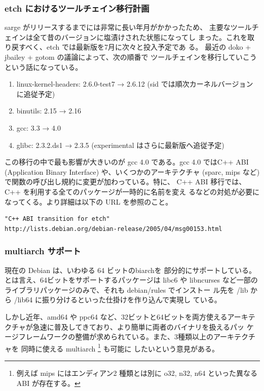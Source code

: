 \documentclass[mingoth,a4paper]{jsarticle}
\begin{document}
  \subsubsection{etch におけるツールチェイン移行計画}

    sarge がリリースするまでには非常に長い年月がかかったため、
    主要なツールチェインは全て昔のバージョンに塩漬けされた状態になってし
    まった。これを取り戻すべく、etch では最新版を7月に次々と投入予定であ
    る。
    最近の doko + jbailey + gotom の議論によって、次の順番で
    ツールチェインを移行していこうという話になっている。

	\begin{enumerate}
	 \item linux-kernel-headers: 2.6.0-test7 → 2.6.12 (sid では順次カーネルバージョンに追従予定)
	 \item binutils: 2.15 → 2.16
	 \item gcc: 3.3 → 4.0
	 \item glibc: 2.3.2.ds1 → 2.3.5 (experimental はさらに最新版へ追従予定)
	\end{enumerate}

    この移行の中で最も影響が大きいのが gcc 4.0 である。gcc 4.0 ではC++
    ABI (Application Binary Interface) や、いくつかのアーキテクチャ 
    (sparc, mips など) で関数の呼び出し規約に変更が加わっている。特に、
    C++ ABI 移行では、C++ を利用する全てのパッケージが一時的に名前を変え
    るなどの対処が必要になってくる。より詳細は以下の URL を参照のこと。

\begin{Verbatim}[frame=single]
"C++ ABI transition for etch"
http://lists.debian.org/debian-release/2005/04/msg00153.html 
\end{Verbatim}

  \subsubsection{multiarch サポート}

    現在の Debian は、いわゆる 64 ビットのbiarchを
    部分的にサポートしている。とは言え、64ビットをサポートするパッケージは
    libc6 や libncurses など一部のライブラリパッケージのみで、それも
    debian/rules でインストー
    ル先を /lib から /lib64 に振り分けるといった仕掛けを作り込んで実現し
    ている。
    
    しかし近年、amd64 や ppc64 など、32ビットと64ビットを両方使えるアーキテ
    クチャが急速に普及してきており、より簡単に両者のバイナリを扱えるパッ
    ケージフレームワークの整備が求められている。また、3種類以上のアーキテクチャを
    同時に使える multiarch \footnote{例えば mips にはエンディアン2
    種類とは別に o32, n32, n64 といった異なる ABI が存在する。} も可能に
    したいという意見がある。
\end{document}
